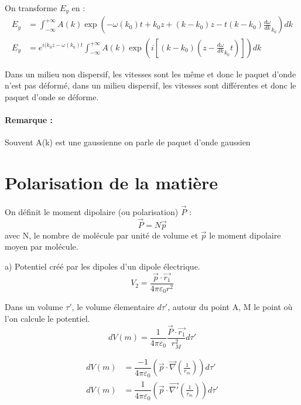\documentclass[12pt,a4paper]{report}
\begin{document}
On transforme \(E_y\) en :
\begin{align*}
	E_y &= \int_{-\infty}^{+\infty} A(k) \exp(-\omega(k_0)t + k_0 z + (k - k_0)z - t(k - k_0)\frac{d\omega}{dk}_{k_0}) dk\\
	E_y &= e^{i(k_0 z - \omega(k_0)t} \int_{-\infty}^{+\infty} A(k) \exp \left(i \left[ (k - k_0)(z - \frac{d\omega}{dk}_{k_0}t) \right]\right) dk
\end{align*}

Dans un milieu non dispersif, les vitesses sont les même et donc le paquet d'onde n'est pas déformé, dans un milieu dispersif, les vitesses sont différentes et donc le paquet d'onde se déforme.

\paragraph{Remarque :} Souvent A(k) est une gaussienne on parle de paquet d'onde gaussien

\section{Polarisation de la matière}

On définit le moment dipolaire (ou polarisation) \(\vec{P}\) :
\[
	\vec{P} = N \vec{p}
\]
avec N, le nombre de molécule par unité de volume et \(\vec{p}\) le moment dipolaire moyen par molécule.

a) Potentiel créé par les dipoles d'un dipole électrique.
\[
	V_2 = \dfrac{\vec{p}\cdot \vec{r_1}}{4\pi \varepsilon_0 r^2}
\]

Dans un volume \(\tau'\), le volume élementaire \(d\tau'\), autour du point A, M le point où l'on calcule le potentiel.
\[
	dV(m) = \dfrac{1}{4\pi \varepsilon_0} \dfrac{\vec{P} \cdot \vec{r_1}}{r_M^2} d\tau'
\]

\begin{align*}
	dV(m) &= \dfrac{-1}{4\pi \varepsilon_0} \left( \vec{p} \cdot \vec{\nabla} (\frac{1}{r_m}) \right) d\tau'\\
	dV(m) &= \dfrac{1}{4\pi \varepsilon_0} \left( \vec{p} \cdot \vec{\nabla'} (\frac{1}{r_m}) \right) d\tau'
\end{align*}
\end{document}

